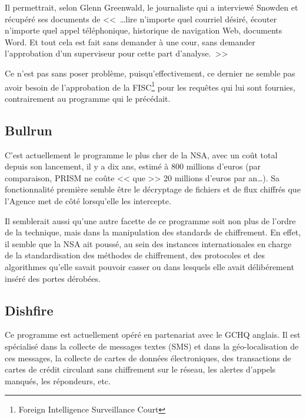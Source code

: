 Il permettrait, selon Glenn Greenwald, le journaliste qui a
interviewé Snowden et récupéré ses documents de <<~\ldots lire n'importe quel
courriel désiré, écouter n'importe quel appel téléphonique, historique de
navigation Web, documents Word. Et tout cela est fait sans demander à une cour,
sans demander l'approbation d'un superviseur pour cette part
d'analyse.~>>\citep{GGW}\newline

Ce n'est pas sans poser problème, puisqu'effectivement, ce dernier
ne semble pas avoir besoin de l'approbation de la FISC\footnote{Foreign
Intelligence Surveillance Court} pour les requêtes qui lui sont
fournies\citep{Kimery}, contrairement au programme qui le précédait.

\subsection{Bullrun}

C'est actuellement le programme le plus cher de la NSA, avec un
coût total depuis son lancement, il y a dix ans, estimé à 800 millions
d'euros\citep{bullrun} (par comparaison, PRISM ne coûte << que >> 20 millions
d'euros par an\ldots).
Sa fonctionnalité première semble être le décryptage de fichiers et de flux
chiffrés que l'Agence met de côté lorsqu'elle les intercepte. \newline

Il semblerait aussi qu'une autre facette de ce programme soit non
plus de l'ordre de la technique, mais dans la manipulation des standards de
chiffrement. En effet, il semble que la NSA ait poussé, au sein des instances
internationales en charge de la standardisation des méthodes de chiffrement, des
protocoles et des algorithmes qu'elle savait pouvoir casser\citep{NYTenc} ou dans
lesquels elle avait délibérement inséré des portes dérobées.

\subsection{Dishfire}

Ce programme est actuellement opéré en partenariat avec le GCHQ
anglais. Il est spécialisé dans la collecte de messages textes (SMS) et dans la
géo-localisation de ces messages, la collecte de cartes de données
électroniques, des transactions de cartes de crédit circulant sans chiffrement sur le réseau,
les alertes d'appels manqués, les répondeurs, etc.\newline

